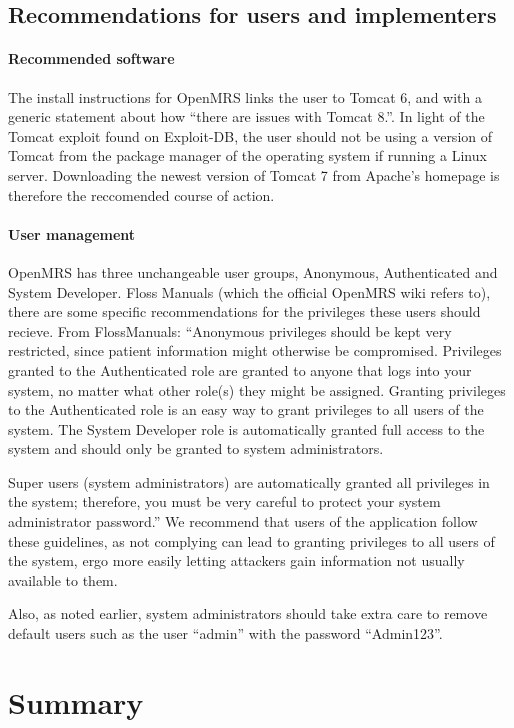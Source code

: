\documentclass{report} %
\begin{document}
\subsection{Recommendations for users and implementers}
\paragraph{Recommended software}
The install instructions for OpenMRS links the user to Tomcat 6, and with a
generic statement about how ``there are issues with Tomcat 8.''. In light of the
Tomcat exploit found on Exploit-DB, the user should not be using a version of Tomcat
from the package manager of the operating system if running a Linux server.
Downloading the newest version of Tomcat 7 from Apache's homepage is therefore
the reccomended course of action.

\paragraph{User management}
OpenMRS has three unchangeable user groups, Anonymous, Authenticated and System
Developer. Floss Manuals (which the official OpenMRS wiki refers to), there are
some specific recommendations for the privileges these users should recieve.
From FlossManuals: ``Anonymous privileges should be kept very restricted, since patient
information might otherwise be compromised. Privileges granted to the
Authenticated role are granted to anyone that logs into your system, no matter
what other role(s) they might be assigned. Granting privileges to the
Authenticated role is an easy way to grant privileges to all users of the
system. The System Developer role is automatically granted full access to the
system and should only be granted to system administrators.

Super users (system administrators) are automatically granted all privileges
in the system; therefore, you must be very careful to protect your system
administrator password.'' \autocite[]{FLOSS}
We recommend that users of the application follow these guidelines, as not
complying can lead to granting privileges to all users of the system, ergo more
easily letting attackers gain information not usually available to them.
\autocite[]{FLOSS}

Also, as noted earlier, system administrators should take extra care to remove
default users such as the user ``admin'' with the password ``Admin123''.

\section{Summary}
\end{document}
